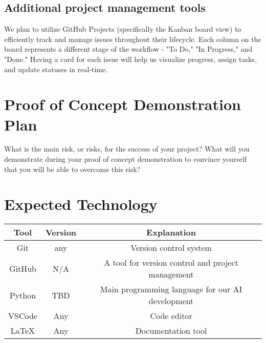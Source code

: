 \documentclass{article}
\begin{document}
\subsection{Additional project management tools}

We plan to utilize GitHub Projects (specifically the Kanban board view) to efficiently track and manage issues throughout their lifecycle. Each column on the board represents a different stage of the workflow - "To Do," "In Progress," and "Done." Having a card for each issue will help us visualize progress, assign tasks, and update statuses in real-time.

\section{Proof of Concept Demonstration Plan}

What is the main risk, or risks, for the success of your project?  What will you
demonstrate during your proof of concept demonstration to convince yourself that
you will be able to overcome this risk?

\section{Expected Technology}



\begin{tabular}{|c|c|c|}
\hline
Tool   & Version & Explanation                                          \\
\hline
Git   & any  & Version control system                                   \\
\hline
GitHub & N/A     & A tool for version control and project management    \\
\hline
Python & TBD     & Main programming language for our AI development     \\
\hline
VSCode & Any     & Code editor                                          \\
\hline              
LaTeX  & Any     & Documentation tool                                   \\
\hline
\end{tabular}
\end{document}
